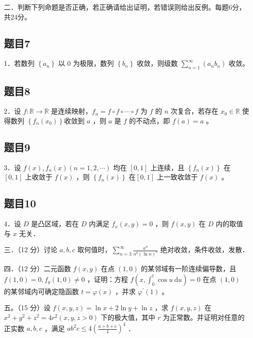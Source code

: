 \documentclass{article}
\begin{document}
二．判断下列命题是否正确，若正确请给出证明，若错误则给出反例。每题6分，共24分。\\

\subsection{题目7}
1．若数列 \(\left\{a_{n}\right\}\) 以 0 为极限，数列 \(\left\{b_{n}\right\}\) 收敛，则级数 \(\sum_{n=1}^{\infty}\left(a_{n} b_{n}\right)\) 收敛。\\

\subsection{题目8}
2．设 \(f: \mathbb{R} \rightarrow \mathbb{R}\) 是连续映射，\(f_{n}=f \circ f \circ \cdots \circ f\) 为 \(f\) 的 \(n\) 次复合，若存在 \(x_{0} \in \mathbb{R}\) 使得数列 \(\left\{f_{n}\left(x_{0}\right)\right\}\)收敛到 \(a\) ，则 \(a\) 是 \(f\) 的不动点，即 \(f(a)=a\) 。\\

\subsection{题目9}
3．设 \(f(x), f_{n}(x)(n=1,2, \cdots)\) 均在 \([0,1]\) 上连续，且 \(\left\{f_{n}(x)\right\}\) 在 \([0,1]\) 上收敛于 \(f(x)\) ，则 \(\left\{f_{n}(x)\right\}\) 在\([0,1]\) 上一致收敛于 \(f(x)\) 。\\

\subsection{题目10}
4．设 \(D\) 是凸区域，若在 \(D\) 内满足 \(f_{x}(x, y)=0\) ，则 \(f(x, y)\) 在 \(D\) 内的取值与 \(x\) 无关．

三．（12 分）讨论 \(a, b, c\) 取何值时，\(\sum_{n=3}^{\infty} \frac{a^{n}}{n^{b}(\ln n)^{c}}\) 绝对收敛，条件收敛，发散．

四．（12 分）二元函数 \(f(x, y)\) 在点 \((1,0)\) 的某邻域有一阶连续偏导数，且 \(f(1,0)=0, f_{y}(1,0) \neq 0\) ，证明：方程 \(f\left(x, \int_{0}^{t} \cos u \mathrm{~d} u\right)=0\) 在点 \((1,0)\) 的某邻域内可确定隐函数 \(t=\varphi(x)\) ，并求 \(\varphi^{\prime}(1)\) 。

五。（15 分）设 \(f(x, y, z)=\ln x+2 \ln y+\ln z\) ，求 \(f(x, y, z)\) 在 \(x^{2}+y^{2}+z^{2}=4 r^{2}(x, y, z>0)\) 下的极大值，其中 \(r\) 为正常数。并证明对任意的正实数 \(a, b, c\) ，满足 \(a b^{2} c \leq 4\left(\frac{a+b+c}{4}\right)^{4}\) ．
\end{document}
